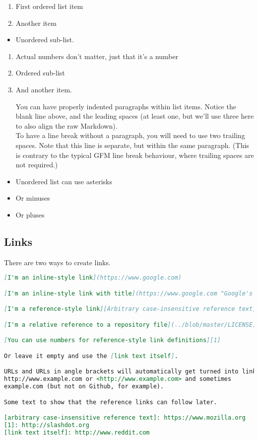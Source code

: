 \documentclass[a4paper, 11pt]{gfm}
\begin{document}
\begin{enumerate}
  \item First ordered list item
  \item Another item
\end{enumerate}

\begin{itemize}
  \item Unordered sub-list.
\end{itemize}

\begin{enumerate}
  \item Actual numbers don't matter, just that it's a number
  \item Ordered sub-list
  \item And another item.
	
	You can have properly indented paragraphs within list items. Notice the blank line above, and the leading spaces (at least one, but we'll use three here to also align the raw Markdown).\\
	
	To have a line break without a paragraph, you will need to use two trailing spaces.
Note that this line is separate, but within the same paragraph.
(This is contrary to the typical GFM line break behaviour, where trailing spaces are not required.)
\end{enumerate}

\begin{itemize}
	\item Unordered list can use asterisks
	\item Or minuses
	\item Or pluses
\end{itemize}

\subsection{Links}

There are two ways to create links.

\begin{lstlisting}[language=Markdown]
[I'm an inline-style link](https://www.google.com)

[I'm an inline-style link with title](https://www.google.com "Google's Homepage")

[I'm a reference-style link][Arbitrary case-insensitive reference text]

[I'm a relative reference to a repository file](../blob/master/LICENSE)

[You can use numbers for reference-style link definitions][1]

Or leave it empty and use the [link text itself].

URLs and URLs in angle brackets will automatically get turned into links. 
http://www.example.com or <http://www.example.com> and sometimes 
example.com (but not on Github, for example).

Some text to show that the reference links can follow later.

[arbitrary case-insensitive reference text]: https://www.mozilla.org
[1]: http://slashdot.org
[link text itself]: http://www.reddit.com
\end{lstlisting}
\end{document}
